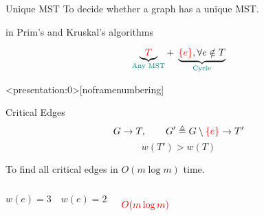 \begin{frame}{}
  \begin{exampleblock}{Unique MST }
    To decide whether a graph has a unique MST.
  \end{exampleblock}

  \pause
  \vspace{0.80cm}
  \centerline{\large {} in Prim's and Kruskal's algorithms}

  \pause

  \pause
  \vspace{-0.30cm}
  \[
    \underbrace{\textcolor{red}{T}}_{\textcolor{teal}{\text{Any MST}}} +\; \underbrace{\textcolor{red}{\{e\}}, \forall e \notin T}_{\textcolor{teal}{\text{Cycle}}}
  \]

  \pause
  \centerline{}
\end{frame}

\begin{frame}<presentation:0>[noframenumbering]
  \begin{exampleblock}{Critical Edges }
    \[
      G \to T, \qquad G' \triangleq G \setminus \textcolor{red}{\{e\}} \to T'
    \]
    \[
      w(T') > w(T)
    \]

    \pause
    \vspace{0.30cm}
    \centerline{To find all critical edges in $O(m \log m)$ time.}
  \end{exampleblock}

  \pause
  \begin{columns}
      \[
	w(e) = 3 \quad w(e) = 2
      \]
      \pause
      \centerline{}

      \pause
      \vspace{0.50cm}
      \centerline{}

      \pause
      \[
	\textcolor{red}{O(m \log m)}
      \]
  \end{columns}
\end{frame}
